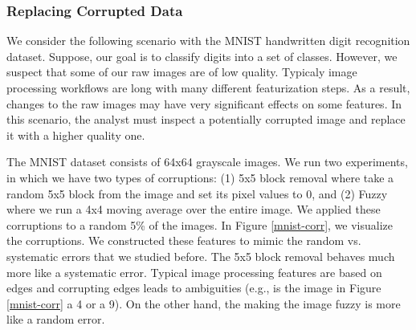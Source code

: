 \subsubsection{Replacing Corrupted Data}
We consider the following scenario with the MNIST handwritten digit recognition dataset.
Suppose, our goal is to classify digits into a set of classes.
However, we suspect that some of our raw images are of low quality.
Typicaly image processing workflows are long with many different featurization steps.
As a result, changes to the raw images may have very significant effects on some features.
In this scenario, the analyst must inspect a potentially corrupted image and replace it with a higher quality one.

The MNIST dataset consists of 64x64 grayscale images.
We run two experiments, in which we have two types of corruptions: (1) 5x5 block removal where take a random 5x5 block from the image and set its pixel values to 0, and (2) Fuzzy where we run a 4x4 moving average over the entire image.
We applied these corruptions to a random 5\% of the images.
In Figure \ref{mnist-corr}, we visualize the corruptions.
We constructed these features to mimic the random vs. systematic errors that we studied before.
The 5x5 block removal behaves much more like a systematic error. 
Typical image processing features are based on edges and corrupting edges leads to ambiguities (e.g., is the image in Figure \ref{mnist-corr} a 4 or a 9).
On the other hand, the making the image fuzzy is more like a random error.

